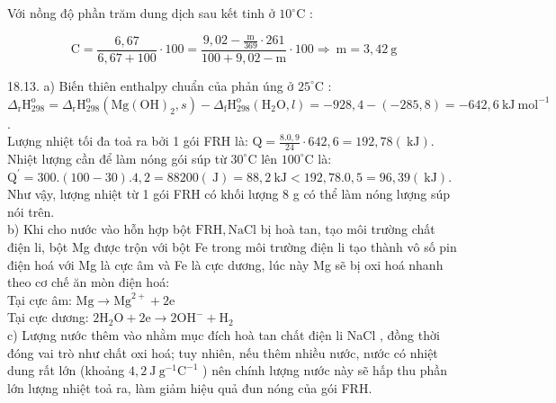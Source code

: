 \documentclass[10pt]{article}
\begin{document}
Với nồng độ phần trăm dung dịch sau kết tinh ở $10^{\circ} \mathrm{C}$ :

$$
\mathrm{C}=\frac{6,67}{6,67+100} \cdot 100=\frac{9,02-\frac{\mathrm{m}}{369} \cdot 261}{100+9,02-\mathrm{m}} \cdot 100 \Rightarrow \mathrm{~m}=3,42 \mathrm{~g}
$$

18.13. a) Biến thiên enthalpy chuẩn của phản úng ở $25^{\circ} \mathrm{C}$ :\\
$\Delta_{\mathrm{r}} \mathrm{H}_{298}^{\mathrm{o}}=\Delta_{\mathrm{r}} \mathrm{H}_{298}^{\mathrm{o}}\left(\mathrm{Mg}(\mathrm{OH})_{2}, s\right)-\Delta_{\mathrm{f}} \mathrm{H}_{298}^{\mathrm{o}}\left(\mathrm{H}_{2} \mathrm{O}, l\right)=-928,4-(-285,8)=-642,6 \mathrm{~kJ} \mathrm{~mol}^{-1}$.\\
Lượng nhiệt tối đa toả ra bởi 1 gói FRH là: $\mathrm{Q}=\frac{8.0,9}{24} \cdot 642,6=192,78(\mathrm{~kJ})$.\\
Nhiệt lượng cần để làm nóng gói súp từ $30^{\circ} \mathrm{C}$ lên $100^{\circ} \mathrm{C}$ là:\\
$\mathrm{Q}^{\prime}=300 .(100-30) .4,2=88200(\mathrm{~J})=88,2 \mathrm{~kJ}<192,78.0,5=96,39(\mathrm{~kJ})$. Như vậy, lượng nhiệt từ 1 gói FRH có khối lượng 8 g có thể làm nóng lượng súp nói trên.\\
b) Khi cho nước vào hỗn hợp bột $\mathrm{FRH}, \mathrm{NaCl}$ bị hoà tan, tạo môi trường chất điện li, bột Mg được trộn với bột Fe trong môi trường điện li tạo thành vô số pin điện hoá với Mg là cực âm và Fe là cực dương, lúc này Mg sẽ bị oxi hoá nhanh theo cơ chế ăn mòn điện hoá:\\
Tại cực âm: $\mathrm{Mg} \rightarrow \mathrm{Mg}^{2+}+2 \mathrm{e}$\\
Tại cực dương: $2 \mathrm{H}_{2} \mathrm{O}+2 \mathrm{e} \rightarrow 2 \mathrm{OH}^{-}+\mathrm{H}_{2}$\\
c) Lượng nước thêm vào nhằm mục đích hoà tan chất điện li NaCl , đồng thời đóng vai trò như chất oxi hoá; tuy nhiên, nếu thêm nhiều nước, nước có nhiệt dung rất lớn (khoảng $4,2 \mathrm{~J} \mathrm{~g}^{-1} \mathrm{C}^{-1}$ ) nên chính lượng nước này sẽ hấp thu phần lớn lượng nhiệt toả ra, làm giảm hiệu quả đun nóng của gói FRH.
\end{document}
